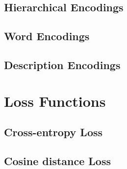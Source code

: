 \subsection{Hierarchical Encodings}
\label{subsec:hierarchical-encodings}

\subsection{Word Encodings}
\label{subsec:word-encoding}

\subsection{Description Encodings}
\label{subsec:description-encodings}

\section{Loss Functions}
\label{sec:losses}

\subsection{Cross-entropy Loss}
\label{subsec:cross-entropy-loss}

\subsection{Cosine distance Loss}
\label{subsec:cosine-distance-loss}

